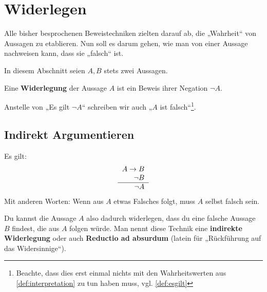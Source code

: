 \section{Widerlegen}


Alle bisher besprochenen Beweistechniken zielten darauf ab, die „Wahrheit“ von Aussagen zu etablieren. Nun soll es darum gehen, wie man von einer Aussage nachweisen kann, dass sie „falsch“ ist.

In diesem Abschnitt seien $A,B$ stets zwei Aussagen.


\begin{defin}[Widerlegung] 
    Eine \textbf{Widerlegung} der Aussage $A$ ist ein Beweis ihrer Negation $\neg A$.
    
    Anstelle von „Es gilt $\neg A$“ schreiben wir auch „$A$ ist falsch“\footnote{Beachte, dass dies erst einmal nichts mit den Wahrheitswerten aus \cref{def:interpretation} zu tun haben muss, vgl. \cref{def:esgilt}}.
\end{defin}


\subsection*{Indirekt Argumentieren}


\begin{axiom} \label{reductio}
    Es gilt:
    \[\begin{tabular}{r}
        $A\to B$ \\
        $\neg B$ \\ \hline
        $\neg A$
    \end{tabular} \]
    Mit anderen Worten: Wenn aus $A$ etwas Falsches folgt, muss $A$ selbst falsch sein.
    
    Du kannst die Aussage $A$ also dadurch widerlegen, dass du eine falsche Aussage $B$ findest, die aus $A$ folgen würde. Man nennt diese Technik eine \textbf{indirekte Widerlegung} oder auch \textbf{Reductio ad absurdum} (latein für „Rückführung auf das Widersinnige“).
\end{axiom}


